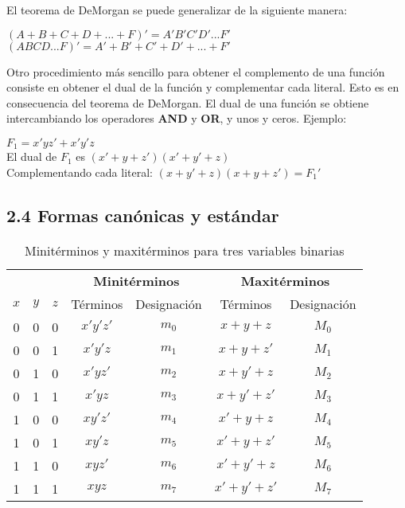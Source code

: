 \documentclass{article}
\begin{document}
El teorema de DeMorgan se puede generalizar de la siguiente manera:
\begin{center}
    $(A + B + C + D + ... + F)' = A'B'C'D'...F'$ \\
    $(ABCD...F)' = A' + B' + C' + D' + ... + F'$
\end{center}

Otro procedimiento m\'{a}s sencillo para obtener el complemento de una funci\'{o}n consiste
en obtener el dual de la funci\'{o}n y complementar cada literal. Esto es en consecuencia del
teorema de DeMorgan. El dual de una funci\'{o}n se obtiene intercambiando los operadores \textbf{AND}
y \textbf{OR}, y unos y ceros. Ejemplo:
\begin{flushleft}
    $F_1 = x'yz' + x'y'z$ \\
    El dual de $F_1$ es $(x' + y + z')(x' + y' + z)$ \\
    Complementando cada literal: $(x + y' + z)(x + y + z') = F_1'$ 
\end{flushleft}
\newpage

\subsection*{2.4 Formas can\'{o}nicas y est\'{a}ndar}
\begin{table}[h]
    \centering
    \begin{tabular}{ccccccc}
        \toprule
        &  &  & \multicolumn{2}{c}{\textbf{Minit\'{e}rminos}} & \multicolumn{2}{c}{\textbf{Maxit\'{e}rminos}} \\
        \cmidrule{4-5} \cmidrule{6-7}
        $x$ & $y$ & $z$ & T\'{e}rminos & Designaci\'{o}n & T\'{e}rminos & Designaci\'{o}n \\
        \midrule
        0 & 0 & 0 & $x'y'z'$ & $m_0$ & $x + y + z$ & $M_0$ \\
        0 & 0 & 1 & $x'y'z$ & $m_1$ & $x + y + z'$ & $M_1$ \\
        0 & 1 & 0 & $x'yz'$ & $m_2$ & $x + y' + z$ & $M_2$ \\
        0 & 1 & 1 & $x'yz$ & $m_3$ & $x + y' + z'$ & $M_3$ \\
        1 & 0 & 0 & $xy'z'$ & $m_4$ & $x' + y + z$ & $M_4$ \\
        1 & 0 & 1 & $xy'z$ & $m_5$ & $x' + y + z'$ & $M_5$ \\
        1 & 1 & 0 & $xyz'$ & $m_6$ & $x' + y' + z$ & $M_6$ \\
        1 & 1 & 1 & $xyz$ & $m_7$ & $x' + y' + z'$ & $M_7$ \\
        \bottomrule
    \end{tabular}
    \caption{Minit\'{e}rminos y maxit\'{e}rminos para tres variables binarias} 
    \label{tab:miniterminos_maxiterminos} 
\end{table}
\end{document}
